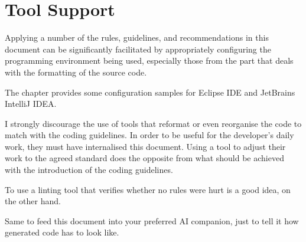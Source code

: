 \section{Tool Support}\label{sec:ToolSupport}
Applying a number of the rules, guidelines, and recommendations in this document can be significantly facilitated by appropriately configuring the programming environment being used, especially those from the part  that deals with the formatting of the source code.

The chapter  provides some configuration samples for Eclipse IDE and JetBrains IntelliJ IDEA.

I strongly discourage the use of tools that reformat or even reorganise the code to match with the coding guidelines. In order to be useful for the developer's daily work, they must have internalised this document. Using a tool to adjust their work to the agreed standard does the opposite from what should be achieved with the introduction of the coding guidelines.

To use a linting tool that verifies whether no rules were hurt is a good idea, on the other hand.

Same to feed this document into your preferred AI companion, just to tell it how generated code has to look like.

